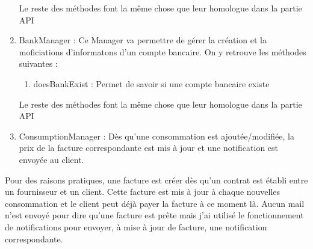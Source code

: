 \begin{flushleft}
\begin{enumerate}
\begin{enumerate}
        \end{enumerate}
        Le reste des méthodes font la même chose que leur homologue dans la partie API
        \item BankManager :\newline
        Ce Manager va permettre de gérer la création et la moficiations d'informatons d'un compte bancaire. On y retrouve les méthodes suivantes : 
        \begin{enumerate}
            \item doesBankExist :\newline
            Permet de savoir si une compte bancaire existe
        \end{enumerate}
        Le reste des méthodes font la même chose que leur homologue dans la partie API
        \item ConsumptionManager :\newline
        Dès qu'une consommation est ajoutée/modifiée, la prix de la facture correspondante est mis à jour et une notification est envoyée au client.
    \end{enumerate}

    Pour des raisons pratiques, une facture est créer dès qu'un contrat est établi entre un fournisseur et un client. Cette facture est mis à jour à chaque nouvelles consommation et le client peut déjà payer la facture à ce moment là. Aucun mail n'est envoyé pour dire qu'une facture est prête mais j'ai utilisé le fonctionnement de notifications pour envoyer, à mise à jour de facture, une notification correspondante.
\end{flushleft}
